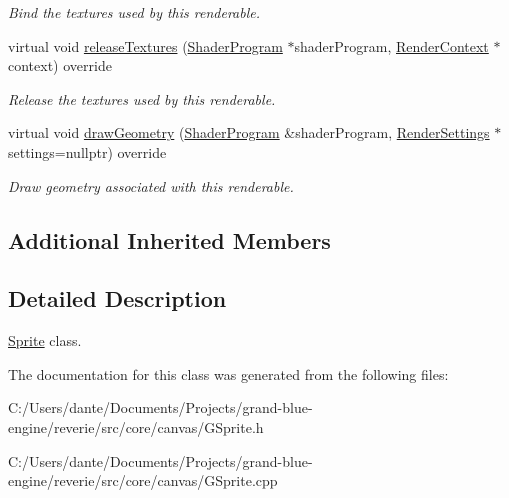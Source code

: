 \begin{DoxyCompactItemize}
\begin{DoxyCompactList}\small\item\em Bind the textures used by this renderable. \end{DoxyCompactList}\item 
\mbox{\label{classrev_1_1_sprite_abfd09a69f6420fb965037adcf805fb45}} 
virtual void \mbox{\hyperlink{classrev_1_1_sprite_abfd09a69f6420fb965037adcf805fb45}{release\+Textures}} (\mbox{\hyperlink{classrev_1_1_shader_program}{Shader\+Program}} $\ast$shader\+Program, \mbox{\hyperlink{classrev_1_1_render_context}{Render\+Context}} $\ast$context) override
\begin{DoxyCompactList}\small\item\em Release the textures used by this renderable. \end{DoxyCompactList}\item 
\mbox{\label{classrev_1_1_sprite_a1831d4fa071c7bc1caf43375d5374cdf}} 
virtual void \mbox{\hyperlink{classrev_1_1_sprite_a1831d4fa071c7bc1caf43375d5374cdf}{draw\+Geometry}} (\mbox{\hyperlink{classrev_1_1_shader_program}{Shader\+Program}} \&shader\+Program, \mbox{\hyperlink{classrev_1_1_render_settings}{Render\+Settings}} $\ast$settings=nullptr) override
\begin{DoxyCompactList}\small\item\em Draw geometry associated with this renderable. \end{DoxyCompactList}\end{DoxyCompactItemize}
\subsection*{Additional Inherited Members}


\subsection{Detailed Description}
\mbox{\hyperlink{classrev_1_1_sprite}{Sprite}} class. 

The documentation for this class was generated from the following files\+:\begin{DoxyCompactItemize}
\item 
C\+:/\+Users/dante/\+Documents/\+Projects/grand-\/blue-\/engine/reverie/src/core/canvas/G\+Sprite.\+h\item 
C\+:/\+Users/dante/\+Documents/\+Projects/grand-\/blue-\/engine/reverie/src/core/canvas/G\+Sprite.\+cpp\end{DoxyCompactItemize}
